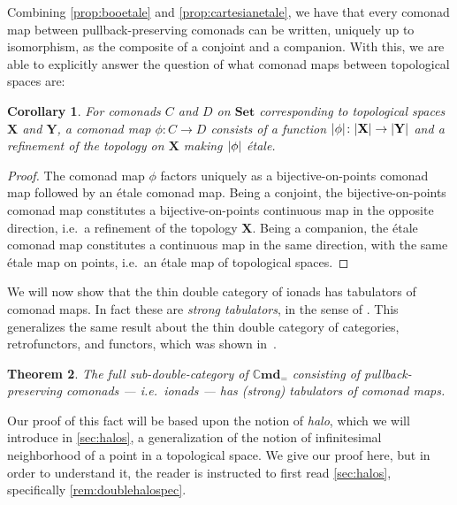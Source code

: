 \documentclass[11pt, oneside, article]{memoir}
\theoremstyle{plain}
\newtheorem{theorem}{Theorem}[section]
\newtheorem{corollary}[theorem]{Corollary}
\theoremstyle{definition}
\theoremstyle{remark}
\DeclarePairedDelimiter{\abs}{\lvert}{\rvert}
\newcommand{\namedcat}[1]{\mathbf{#1}}
\newcommand{\spa}[1]{\mathbf{#1}}
\newcommand{\Set}{\namedcat{Set}}
\newcommand{\Cmd}{\mathbb{C}\namedcat{md}}
\newcommand{\CmdId}{\Cmd_=}
\newcommand{\CmdIdSet}{\CmdId}
\newcommand{\pts}[1]{{\abs{#1}}}
\newcommand{\one}[1]{\pts{#1}}
\newcommand{\cmnd}[1]{{#1}}
\newcommand{\cC}{\cmnd{C}}
\newcommand{\cD}{\cmnd{D}}
\newcommand{\tX}{\spa{X}}
\newcommand{\tY}{\spa{Y}}
\begin{document}

Combining \cref{prop:booetale} and \cref{prop:cartesianetale}, we have
that every comonad map between pullback-preserving comonads can be
written, uniquely up to isomorphism, as the composite of a conjoint
and a companion.  With this, we are able to explicitly answer the
question of what comonad maps between topological spaces are:

\begin{corollary}\label{cor:topcom}
  For comonads $\cC$ and $\cD$ on $\Set$ corresponding to topological
  spaces $\tX$ and $\tY$, a comonad map $\phi \colon \cC \to \cD$
  consists of a function $\one{\phi} \colon \pts{\tX} \to \pts{\tY}$
  and a refinement of the topology on $\tX$ making $\one{\phi}$
  \'etale.
\end{corollary}
\begin{proof}
  The comonad map $\phi$ factors uniquely as a bijective-on-points
  comonad map followed by an \'etale comonad map. Being a conjoint,
  the bijective-on-points comonad map constitutes a
  bijective-on-points continuous map in the opposite direction, i.e.\
  a refinement of the topology $\tX$. Being a companion, the \'etale
  comonad map constitutes a continuous map in the same direction, with
  the same \'etale map on points, i.e.\ an \'etale map of topological
  spaces.
\end{proof}

We will now show that the thin double category of ionads has
tabulators of comonad maps. In fact these are \emph{strong
  tabulators}, in the sense of \cite{aleiferi,clarke}. This
generalizes the same result about the thin double category of
categories, retrofunctors, and functors, which was shown
in~\cite[Proposition 3.5]{clarke}.


\begin{theorem}\label{thm:strongtabulators}
  The full sub-double-category of $\CmdIdSet$ consisting of
  pullback-preserving comonads --- i.e.\ ionads --- has (strong)
  tabulators of comonad maps.
\end{theorem}

Our proof of this fact will be based upon the notion of \emph{halo},
which we will introduce in \cref{sec:halos}, a generalization of the
notion of infinitesimal neighborhood of a point in a topological
space. We give our proof here, but in order to understand it, the
reader is instructed to first read \cref{sec:halos}, specifically
\cref{rem:doublehalospec}.
\end{document}
